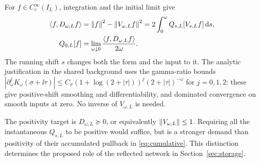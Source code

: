 For $f\in C_c^\infty(I_L)$, integration and the initial limit give
\begin{align}
 \left\langle f,D_{\omega,L}f\right\rangle
 &=\left\lVert f\right\rVert^2-\left\lVert V_{\omega,L}f\right\rVert^2
 =2\int_0^\omega Q_{s,L}[V_{s,L}f]\,\mathrm d s,
 \label{eq:cumulative}\\
 Q_{0,L}[f]
 &=\lim_{\omega\downarrow0}
        \frac{\left\langle f,D_{\omega,L}f\right\rangle}{2\omega}.
 \label{eq:central-limit}
\end{align}
The running shift $s$ changes both the form and the input to it.
The analytic justification in the shared background uses the
gamma-ratio bounds
$|\partial_\omega^jK_\omega(\sigma+\ii\tau)|
\leq C_\sigma(1+\log(2+|\tau|))^j(2+|\tau|)^{-\omega}$
for $j=0,1,2$: these give positive-shift smoothing and
differentiability, and dominated convergence on smooth inputs at
zero. No inverse of $V_{\omega,L}$ is needed.

The positivity target is $D_{\omega,L}\succeq0$, or equivalently
$\left\lVert V_{\omega,L}\right\rVert\leq1$. Requiring all the instantaneous
$Q_{s,L}$ to be positive would suffice, but is a stronger demand
than positivity of their accumulated pullback in
\eqref{eq:cumulative}. This distinction determines the proposed
role of the reflected network in Section~\ref{sec:storage}.
